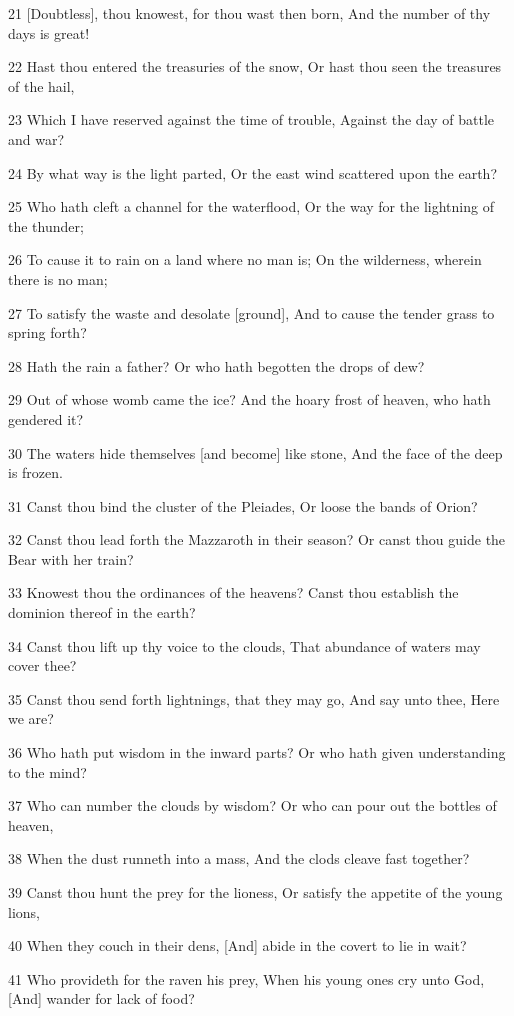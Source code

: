 \par 21 [Doubtless], thou knowest, for thou wast then born, And the number of thy days is great!
\par 22 Hast thou entered the treasuries of the snow, Or hast thou seen the treasures of the hail,
\par 23 Which I have reserved against the time of trouble, Against the day of battle and war?
\par 24 By what way is the light parted, Or the east wind scattered upon the earth?
\par 25 Who hath cleft a channel for the waterflood, Or the way for the lightning of the thunder;
\par 26 To cause it to rain on a land where no man is; On the wilderness, wherein there is no man;
\par 27 To satisfy the waste and desolate [ground], And to cause the tender grass to spring forth?
\par 28 Hath the rain a father? Or who hath begotten the drops of dew?
\par 29 Out of whose womb came the ice? And the hoary frost of heaven, who hath gendered it?
\par 30 The waters hide themselves [and become] like stone, And the face of the deep is frozen.
\par 31 Canst thou bind the cluster of the Pleiades, Or loose the bands of Orion?
\par 32 Canst thou lead forth the Mazzaroth in their season? Or canst thou guide the Bear with her train?
\par 33 Knowest thou the ordinances of the heavens? Canst thou establish the dominion thereof in the earth?
\par 34 Canst thou lift up thy voice to the clouds, That abundance of waters may cover thee?
\par 35 Canst thou send forth lightnings, that they may go, And say unto thee, Here we are?
\par 36 Who hath put wisdom in the inward parts? Or who hath given understanding to the mind?
\par 37 Who can number the clouds by wisdom? Or who can pour out the bottles of heaven,
\par 38 When the dust runneth into a mass, And the clods cleave fast together?
\par 39 Canst thou hunt the prey for the lioness, Or satisfy the appetite of the young lions,
\par 40 When they couch in their dens, [And] abide in the covert to lie in wait?
\par 41 Who provideth for the raven his prey, When his young ones cry unto God, [And] wander for lack of food?

